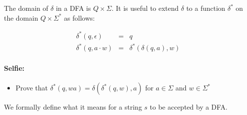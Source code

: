 The domain of $\delta$ in a DFA is $Q \times \Sigma$. It is useful to extend
$\delta$ to a function $\delta^*$ on the domain $Q \times \Sigma^*$ as follows:

\begin{eqnarray*}
\delta^*(q,\epsilon) & = & q \\
\delta^*(q,a \cdot w) & = & \delta^*(\delta(q,a),w)
\end{eqnarray*}

\paragraph{Selfie:}
\begin{itemize}
\item[]
Prove that $\delta^*(q,wa) = \delta(\delta^*(q,w),a)$ for $a \in
\Sigma$ and $w \in \Sigma^*$
\end{itemize}

%  


We formally define what it means for a string $s$ to be accepted by a
DFA.


